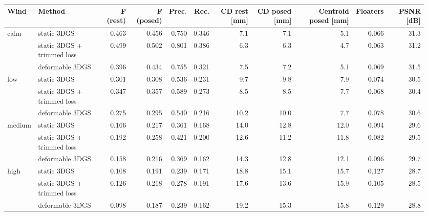 \begin{tabular}{llrrrrrrrrr}
\toprule
Wind & Method & F (rest) & F (posed) & Prec. & Rec. & CD rest [mm] & CD posed [mm] & Centroid posed [mm] & Floaters & PSNR [dB] \\
\midrule
calm & static 3DGS & 0.463 & 0.456 & 0.750 & 0.346 & 7.1 & 7.1 & 5.1 & 0.066 & 31.3 \\
 & static 3DGS + trimmed loss & 0.499 & 0.502 & 0.801 & 0.386 & 6.3 & 6.3 & 4.7 & 0.063 & 31.2 \\
 & deformable 3DGS & 0.396 & 0.434 & 0.755 & 0.321 & 7.5 & 7.2 & 5.1 & 0.069 & 31.5 \\
\midrule
low & static 3DGS & 0.301 & 0.308 & 0.536 & 0.231 & 9.7 & 9.8 & 7.9 & 0.074 & 30.5 \\
 & static 3DGS + trimmed loss & 0.347 & 0.357 & 0.589 & 0.273 & 8.5 & 8.5 & 7.7 & 0.068 & 30.4 \\
 & deformable 3DGS & 0.275 & 0.295 & 0.540 & 0.216 & 10.2 & 10.0 & 7.7 & 0.078 & 30.6 \\
\midrule
medium & static 3DGS & 0.166 & 0.217 & 0.361 & 0.168 & 14.0 & 12.8 & 12.0 & 0.094 & 29.6 \\
 & static 3DGS + trimmed loss & 0.192 & 0.258 & 0.421 & 0.200 & 12.6 & 11.2 & 11.8 & 0.082 & 29.5 \\
 & deformable 3DGS & 0.158 & 0.216 & 0.369 & 0.162 & 14.3 & 12.8 & 12.1 & 0.096 & 29.7 \\
\midrule
high & static 3DGS & 0.108 & 0.191 & 0.239 & 0.171 & 18.8 & 15.1 & 15.7 & 0.127 & 28.7 \\
 & static 3DGS + trimmed loss & 0.126 & 0.218 & 0.278 & 0.191 & 17.6 & 13.6 & 15.9 & 0.105 & 28.5 \\
 & deformable 3DGS & 0.098 & 0.187 & 0.239 & 0.162 & 19.2 & 15.3 & 15.8 & 0.129 & 28.8 \\
\bottomrule
\end{tabular}
